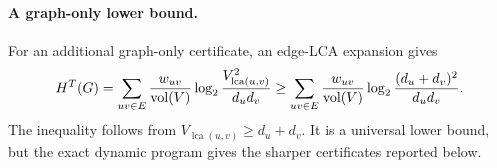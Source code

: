 \paragraph{A graph-only lower bound.}
For an additional graph-only certificate, an edge-LCA expansion gives
\begin{equation}
H^T(G)=\sum_{uv\in E}\frac{w_{uv}}{\operatorname{vol}(V)}
\log_2\frac{V_{\operatorname{lca}(u,v)}^2}{d_ud_v}
\ge \sum_{uv\in E}\frac{w_{uv}}{\operatorname{vol}(V)}
\log_2\frac{(d_u+d_v)^2}{d_ud_v}.
\label{eq:edge-bound}
\end{equation}
The inequality follows from
$V_{\operatorname{lca}(u,v)}\ge d_u+d_v$. It is a universal lower bound, but
the exact dynamic program gives the sharper certificates reported below.
\fi

